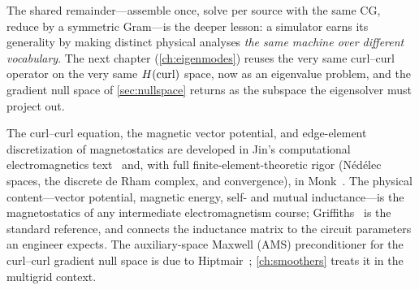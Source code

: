 The shared remainder---assemble once, solve per source with the same CG, reduce by a
symmetric Gram---is the deeper lesson: a simulator earns its generality by making
distinct physical analyses \emph{the same machine over different vocabulary}. The
next chapter (\cref{ch:eigenmodes}) reuses the very same curl--curl operator on the
very same $H(\mathrm{curl})$ space, now as an eigenvalue problem, and the gradient null space
of \cref{sec:nullspace} returns as the subspace the eigensolver must project out.

\furtherreading

The curl--curl equation, the magnetic vector potential, and edge-element
discretization of magnetostatics are developed in Jin's computational
electromagnetics text~\citep{jin2014} and, with full finite-element-theoretic rigor
(N\'ed\'elec spaces, the discrete de Rham complex, and convergence), in
Monk~\citep{monk2003}. The physical content---vector potential, magnetic energy,
self- and mutual inductance---is the magnetostatics of any intermediate
electromagnetism course; Griffiths~\citep{griffiths2017} is the standard reference,
and connects the inductance matrix to the circuit parameters an engineer expects.
The auxiliary-space Maxwell (AMS) preconditioner for the curl--curl gradient null
space is due to Hiptmair~\citep{hiptmair1998}; \cref{ch:smoothers} treats it in the
multigrid context.

\exercisessection

